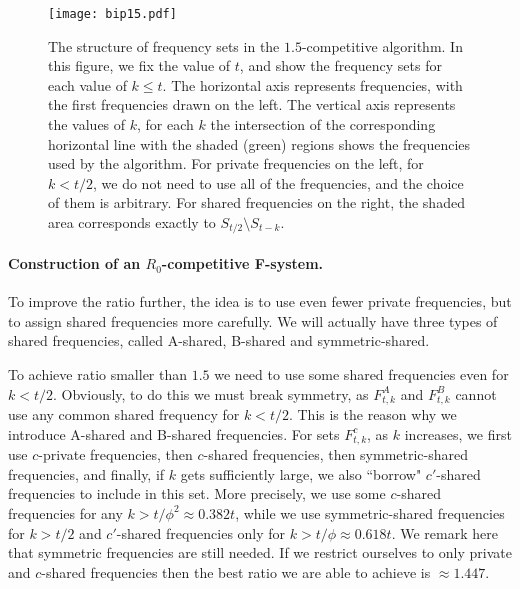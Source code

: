 \documentclass[11pt]{article}
\begin{document}
\begin{figure}[t]
\begin{center}
\texttt{[image: bip15.pdf]}

\caption{The structure of frequency sets in the $1.5$-competitive
algorithm.  In this figure, we fix the value of $t$, and show the
frequency sets for each value of $k\leq t$.  The horizontal axis
represents frequencies, with the first frequencies drawn on the left.
The vertical axis represents the values of $k$, for each $k$ the
intersection of the corresponding horizontal line with the shaded
(green) regions shows the frequencies used by the algorithm.  For
private frequencies on the left, for $k<t/2$, we do not need to use
all of the frequencies, and the choice of them is arbitrary.  For
shared frequencies on the right, the shaded area corresponds exactly
to $S_{t/2} \setminus S_{t-k}$.  }
\label{fig: shared frequencies 1.5}
\end{center}
\end{figure}



\paragraph{Construction of an $R_0$-competitive F-system.}

To improve the ratio further, the idea is to use even fewer private
frequencies, but to assign shared frequencies more carefully. We will
actually have three types of shared frequencies, called A-shared,
B-shared and symmetric-shared.  

To achieve ratio smaller than $1.5$ we need to use some shared
frequencies even for $k<t/2$. Obviously, to do this we must break
symmetry, as $F^A_{t,k}$ and $F^B_{t,k}$ cannot use any common shared
frequency for $k<t/2$. This is the reason why we introduce A-shared
and B-shared frequencies.  For sets $F^c_{t,k}$, as $k$ increases, we
first use $c$-private frequencies, then $c$-shared frequencies, then
symmetric-shared frequencies, and finally, if $k$ gets sufficiently
large, we also ``borrow" $c'$-shared frequencies to include in this
set. More precisely, we use some $c$-shared frequencies for any
$k>t/\phi^2\approx 0.382 t$, while we use symmetric-shared frequencies
for $k > t/2$ and $c'$-shared frequencies only for $k>t/\phi\approx
0.618 t$.  We remark here that symmetric frequencies are still
needed. If we restrict ourselves to only private and $c$-shared
frequencies then the best ratio we are able to achieve is $\approx
1.447$.
\end{document}
